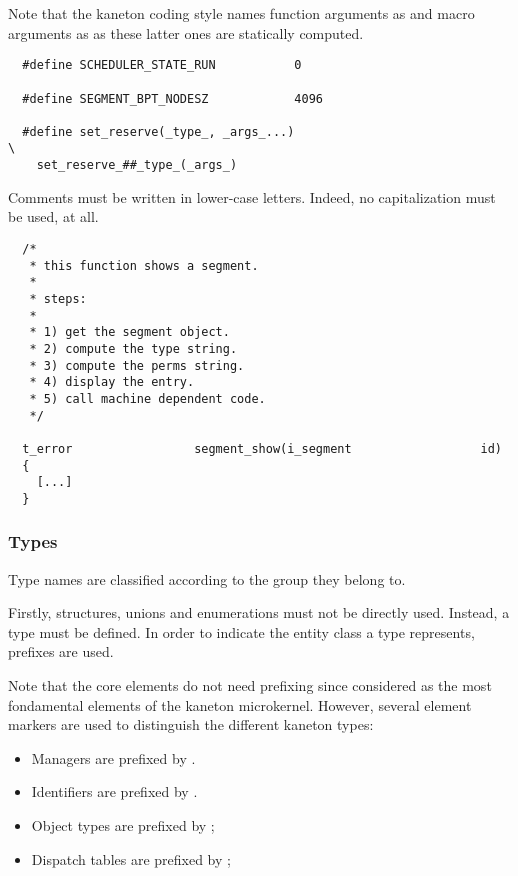 Note that the kaneton coding style names function arguments as
 and macro arguments as  as these
latter ones are statically computed.

\begin{verbatim}
  #define SCHEDULER_STATE_RUN           0

  #define SEGMENT_BPT_NODESZ            4096

  #define set_reserve(_type_, _args_...)                                \
    set_reserve_##_type_(_args_)
\end{verbatim}

Comments must be written in lower-case letters. Indeed, no capitalization
must be used, at all.

\begin{verbatim}
  /*
   * this function shows a segment.
   *
   * steps:
   *
   * 1) get the segment object.
   * 2) compute the type string.
   * 3) compute the perms string.
   * 4) display the entry.
   * 5) call machine dependent code.
   */

  t_error                 segment_show(i_segment                  id)
  {
    [...]
  }
\end{verbatim}


\subsubsection{Types}

Type names are classified according to the group they belong to.

Firstly, structures, unions and enumerations must not be directly used.
Instead, a type must be defined. In order to indicate the entity class a type
represents, prefixes are used.

Note that the core elements do not need prefixing since considered as the
most fondamental elements of the kaneton microkernel. However, several
element markers are used to distinguish the different kaneton types:

\begin{itemize}
  \item
    Managers are prefixed by .
  \item
    Identifiers are prefixed by .
  \item
    Object types are prefixed by ;
  \item
    Dispatch tables are prefixed by ;
\end{itemize}

